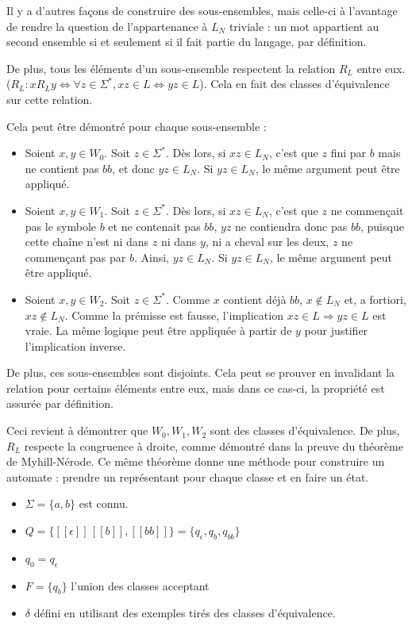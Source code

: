 	 Il y a d'autres façons de construire des sous-ensembles, mais celle-ci à l'avantage de rendre la question de l'appartenance à $L_N$ triviale : un mot appartient au second ensemble si et seulement si il fait partie du langage, par définition.
	 
	 De plus, tous les éléments d'un sous-ensemble respectent la relation $R_L$ entre eux. ($R_L : xR_Ly \Leftrightarrow \forall z \in \Sigma^*, xz \in L \Leftrightarrow yz \in L$). Cela en fait des classes d'équivalence sur cette relation.
	 
	 Cela peut être démontré pour chaque sous-ensemble :
	 \begin{itemize}
	 	\item Soient $x,y \in W_0$. Soit $z \in \Sigma^*$. Dès lors, si $xz \in L_N$, c'est que $z$ fini par $b$ mais ne contient pas $bb$, et donc $yz \in L_N$. Si $yz \in L_N$, le même argument peut être appliqué.
	 	\item Soient $x,y \in W_1$. Soit $z \in \Sigma^*$. Dès lors, si $xz \in L_N$, c'est que $z$ ne commençait pas le symbole $b$ et ne contenait pas $bb$, $yz$ ne contiendra donc pas $bb$, puisque cette chaîne n'est ni dans $z$ ni dans $y$, ni a cheval sur les deux, $z$ ne commençant pas par $b$. Ainsi, $yz \in L_N$. Si $yz \in L_N$, le même argument peut être appliqué.
	 	\item Soient $x,y \in W_2$. Soit $z \in \Sigma^*$. Comme $x$ contient déjà $bb$, $x \notin L_N$ et, a fortiori, $xz \notin L_N$. Comme la prémisse est fausse, l'implication $xz \in L \Rightarrow yz \in L$ est vraie. La même logique peut être appliquée à partir de $y$ pour justifier l'implication inverse.
	 \end{itemize}
	 
	 De plus, ces sous-ensembles sont disjoints. Cela peut se prouver en invalidant la relation pour certains éléments entre eux, mais dans ce cas-ci, la propriété est assurée par définition.
	 
	 Ceci revient à démontrer que $W_0,W_1,W_2$ sont des classes d'équivalence. De plus, $R_L$ respecte la congruence à droite, comme démontré dans la preuve du théorème de Myhill-Nérode. Ce même théorème donne une méthode pour construire un automate : prendre un représentant pour chaque classe et en faire un état.
	 
	 \begin{itemize}
	 	\item $\Sigma=\{a,b\}$ est connu.
	 	\item $Q=\{[[\epsilon]]\, [[b]], [[bb]]\} = \{q_\epsilon, q_b, q_{bb}\}$
	 	\item $q_0 = q_\epsilon$ 
	 	\item $F = \{q_b\}$ l'union des classes acceptant
	 	\item $\delta$ défini en utilisant des exemples tirés des classes d'équivalence.
	 \end{itemize}
	 
